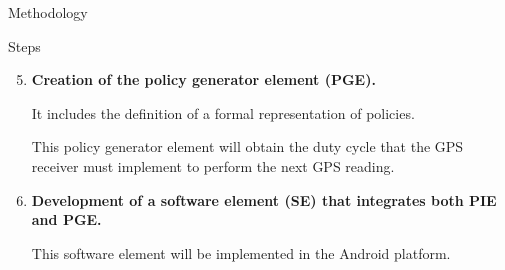\begin{frame}{Methodology}
  \small
  \begin{block}{Steps}
    \begin{enumerate}
      \setcounter{enumi}{4}

      \item \textbf{Creation of the policy generator element (PGE).}

        It includes the definition of a formal representation of policies.
        
        This policy generator element will obtain the duty cycle that the GPS receiver must implement to perform the next GPS reading.


      \item \textbf{Development of a software element (SE) that integrates both PIE and PGE.}

        This software element will be implemented in the Android platform.
        



\end{enumerate}
\end{block}
\end{frame}
